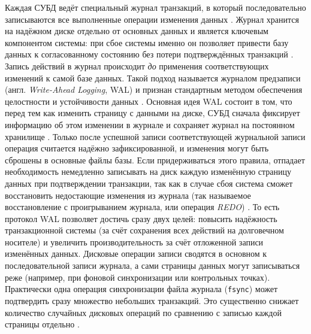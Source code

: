  Каждая СУБД ведёт специальный журнал транзакций, в который последовательно записываются все выполненные операции изменения данных \autocite{MicrosoftLearnSQLserverTransLog}. Журнал хранится на надёжном диске отдельно от основных данных и является ключевым компонентом системы: при сбое системы именно он позволяет привести базу данных к согласованному состоянию без потери подтверждённых транзакций \autocite{MicrosoftLearnSQLserverTransLog}. Запись действий в журнал происходит \textit{до} применения соответствующих изменений к самой базе данных. Такой подход называется журналом предзаписи (англ. \textit{Write-Ahead Logging}, WAL) и признан стандартным методом обеспечения целостности и устойчивости данных \autocite{PostgreSQLdocc28}. Основная идея WAL состоит в том, что перед тем как изменить страницу с данными на диске, СУБД сначала фиксирует информацию об этом изменении в журнале и сохраняет журнал на постоянном хранилище \autocite{PostgreSQLdocc28}. Только после успешной записи соответствующей журнальной записи операция считается надёжно зафиксированной, и изменения могут быть сброшены в основные файлы базы. Если придерживаться этого правила, отпадает необходимость немедленно записывать на диск каждую изменённую страницу данных при подтверждении транзакции, так как в случае сбоя система сможет восстановить недостающие изменения из журнала (так называемое восстановление с проигрыванием журнала, или операция \textit{REDO}) \autocite{PostgreSQLdocc28}. То есть протокол WAL позволяет достичь сразу двух целей: повысить надёжность транзакционной системы (за счёт сохранения всех действий на долговечном носителе) и увеличить производительность за счёт отложенной записи изменённых данных. Дисковые операции записи сводятся в основном к последовательной записи журнала, а сами страницы данных могут записываться реже (например, при фоновой синхронизации или контрольных точках). Практически одна операция синхронизации файла журнала (\texttt{fsync}) может подтвердить сразу множество небольших транзакций. Это существенно снижает количество случайных дисковых операций по сравнению с записью каждой страницы отдельно \autocite{PostgreSQLdocc28}. 
 
